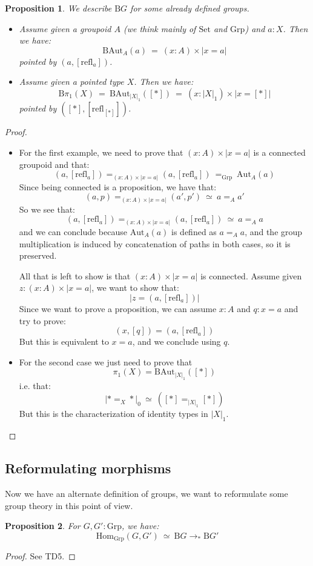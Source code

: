 \documentclass{article}
\newcommand{\sse}[1]{\medbreak \subsection{#1}}
\renewcommand{\r}{\rightarrow}
\newcommand{\refl}{\mathrm{refl}}
\newcommand{\Grp}{\mathrm{Grp}}
\newcommand{\Hom}{\mathrm{Hom}}
\newcommand{\B}{\mathrm{B}}
\newcommand{\Aut}{\mathrm{Aut}}
\newcommand{\Set}{\mathrm{Set}}
\newtheorem{proposition}{Proposition}
\begin{document}
\begin{proposition}
We describe $\B G$ for some already defined groups.
\begin{itemize}
\item Assume given a groupoid $A$ (we think mainly of $\Set$ and $\Grp$) and $a:X$. Then we have:
\[\B \Aut_A(a) \ = \ (x:A)\times |x=a|\]
pointed by $(a,[\refl_a])$.
\item Assume given a pointed type $X$. Then we have:
\[\B\pi_1(X) \ = \ \B\Aut_{|X|_1}([*])\ = \ (x:|X|_1)\times |x=[*]|\]
pointed by $([*],[\refl_{[*]}])$.
\end{itemize}
\end{proposition}
\begin{proof}
\begin{itemize}
\item For the first example, we need to prove that $(x:A)\times |x=a|$ is a connected groupoid and that: 
\[(a,[\refl_a]) =_{(x:A)\times |x=a|}(a,[\refl_a])\ =_\Grp\ \Aut_A(a)\]
Since being connected is a proposition, we have that:
\[(a,p) =_{(x:A)\times |x=a|} (a',p') \ \simeq \ a=_Aa'\]
So we see that:
\[(a,[\refl_a]) =_{(x:A)\times |x=a|}(a,[\refl_a])\ \simeq\ a=_Aa\]
and we can conclude because $\Aut_A(a)$ is defined as $a=_Aa$, and the group multiplication is induced by concatenation of paths in both cases, so it is preserved.

All that is left to show is that $(x:A)\times |x=a|$ is connected. Assume given $z:(x:A)\times |x=a|$, we want to show that:
\[|z = (a,[\refl_a])|\]
Since we want to prove a proposition, we can assume $x:A$ and $q:x=a$ and try to prove:
\[(x,[q]) = (a,[\refl_a])\]
But this is equivalent to $x=a$, and we conclude using $q$.

\item For the second case we just need to prove that 
\[\pi_1(X) = \B\Aut_{|X|_1}([*])\]
i.e. that:
\[|*=_X*|_0 \ \simeq\ ([*] =_{|X|_1} [*])\] 
But this is the characterization of identity types in $|X|_1$. 
\end{itemize} 
\end{proof}


\sse{Reformulating morphisms}

Now we have an alternate definition of groups, we want to reformulate some group theory in this point of view.

\begin{proposition}
For $G,G':\Grp$, we have:
\[\Hom_\Grp(G,G') \ \simeq \ \B G\r_* \B G'\]
\end{proposition}
\begin{proof}
See TD5.
\end{proof}
\end{document}
